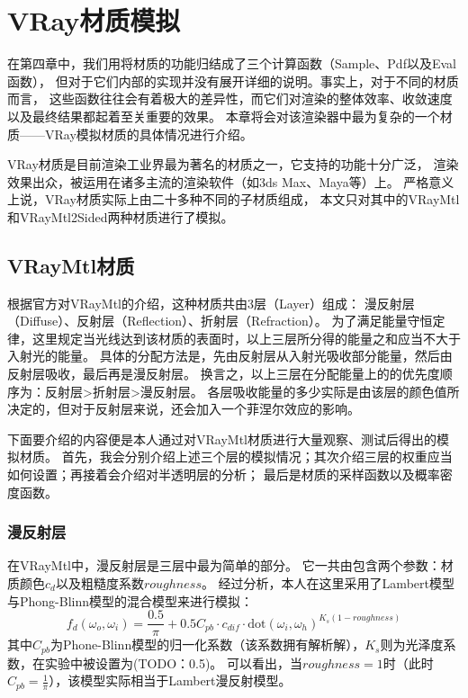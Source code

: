 \chapter{VRay材质模拟}
\label{cha:vray}

在第四章中，我们用将材质的功能归结成了三个计算函数（Sample、Pdf以及Eval函数），
但对于它们内部的实现并没有展开详细的说明。事实上，对于不同的材质而言，
这些函数往往会有着极大的差异性，而它们对渲染的整体效率、收敛速度以及最终结果都起着至关重要的效果。
本章将会对该渲染器中最为复杂的一个材质——VRay模拟材质的具体情况进行介绍。

VRay材质\cite{VRay}是目前渲染工业界最为著名的材质之一，它支持的功能十分广泛，
渲染效果出众，被运用在诸多主流的渲染软件（如3ds Max、Maya等）上。
严格意义上说，VRay材质实际上由二十多种不同的子材质组成，
本文只对其中的VRayMtl和VRayMtl2Sided两种材质进行了模拟。


\section{VRayMtl材质}

根据官方对VRayMtl的介绍，这种材质共由3层（Layer）组成：
漫反射层（Diffuse）、反射层（Reflection）、折射层（Refraction）。
为了满足能量守恒定律，这里规定当光线达到该材质的表面时，以上三层所分得的能量之和应当不大于入射光的能量。
具体的分配方法是，先由反射层从入射光吸收部分能量，然后由反射层吸收，最后再是漫反射层。
换言之，以上三层在分配能量上的的优先度顺序为：反射层>折射层>漫反射层。
各层吸收能量的多少实际是由该层的颜色值所决定的，但对于反射层来说，还会加入一个菲涅尔效应的影响。

下面要介绍的内容便是本人通过对VRayMtl材质进行大量观察、测试后得出的模拟材质。
首先，我会分别介绍上述三个层的模拟情况；其次介绍三层的权重应当如何设置；再接着会介绍对半透明层的分析；
最后是材质的采样函数以及概率密度函数。

\subsection{漫反射层}

在VRayMtl中，漫反射层是三层中最为简单的部分。
它一共由包含两个参数：材质颜色$c_{d}$以及粗糙度系数$roughness$。
经过分析，本人在这里采用了Lambert模型与Phong-Blinn模型的混合模型来进行模拟：
\begin{equation}
f_d(\omega_o, \omega_i) = \frac{0.5}{\pi} + 0.5C_{pb}\cdot c_{dif} \cdot \text{dot}(\omega_i, \omega_h)^{K_s(1-roughness)}
\end{equation}
其中$C_{pb}$为Phone-Blinn模型的归一化系数（该系数拥有解析解\cite{Phong}），$K_s$则为光泽度系数，在实验中被设置为(TODO：0.5)。
可以看出，当$roughness=1$时（此时$C_{pb}=\frac{1}{\pi}$），该模型实际相当于Lambert漫反射模型。

